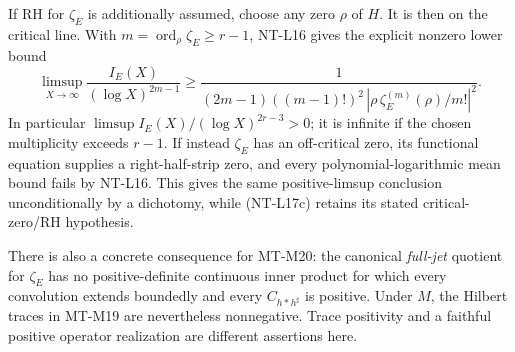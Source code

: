 \documentclass[11pt,a4paper]{article}
\begin{document}
If RH for $\zeta_E$ is additionally assumed, choose any zero $\rho$
of $H$. It is then on the critical line. With
$m=\operatorname{ord}_\rho\zeta_E\ge r-1$, NT-L16 gives the explicit
nonzero lower bound
\[
 \limsup_{X\to\infty}\frac{I_E(X)}{(\log X)^{2m-1}}
 \ge
 \frac1{(2m-1)((m-1)!)^2\,
             |\rho\,\zeta_E^{(m)}(\rho)/m!|^2}.
                                                        \tag{NT-L17c}
\]
In particular $\limsup I_E(X)/(\log X)^{2r-3}>0$; it is infinite
if the chosen multiplicity exceeds $r-1$. If instead $\zeta_E$
has an off-critical zero, its functional equation supplies a
right-half-strip zero, and every polynomial-logarithmic mean bound
fails by NT-L16. This gives the same positive-limsup conclusion
unconditionally by a dichotomy, while (NT-L17c) retains its stated
critical-zero/RH hypothesis.

There is also a concrete consequence for MT-M20: the canonical
\emph{full-jet} quotient for $\zeta_E$ has no positive-definite
continuous inner product for which every convolution extends boundedly
and every $C_{h*h^\sharp}$ is positive. Under $M$, the Hilbert traces
in MT-M19 are nevertheless nonnegative. Trace positivity and a faithful
positive operator realization are different assertions here.
\end{document}
